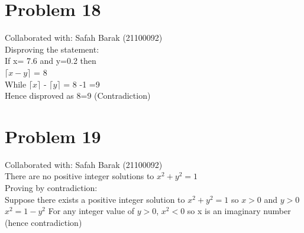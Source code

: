 \documentclass{article}
\begin{document}
\section{Problem 18}
Collaborated with:  Safah Barak (21100092) \\
Disproving the statement: \\ If x= 7.6 and y=0.2 then \\ $\lceil x-y\rceil$ = 8 \\ While $\lceil x\rceil$ - $\lceil y\rceil$ = 8 -1 =9 \\ Hence disproved as 8=9 (Contradiction)

\section{Problem 19}
Collaborated with:  Safah Barak (21100092)\\
There are no positive integer solutions to $ x^{2} + y^{2} = 1$ \\ Proving by contradiction: \\ Suppose there exists a positive integer solution to $ x^{2} + y^{2} = 1$  so $x>0$ and $y>0$\\ $ x^{2} = 1-  y^{2}$ For any integer value of $y >0$, $x^{2}<$0 so x is an imaginary number (hence contradiction)
\end{document}
